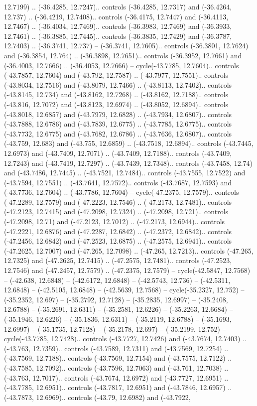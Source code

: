 \begin{scope}[shift={(2.5552, 9.9912)}]
\begin{scope}[shift={(48.1654, -14.8546)}]
12.7199) .. (-36.4285, 12.7247).. controls (-36.4285, 12.7317) and (-36.4264, 12.737) .. (-36.4219, 12.7408).. controls (-36.4175, 12.7447) and (-36.4113, 12.7467) .. (-36.4034, 12.7469).. controls (-36.3983, 12.7469) and (-36.3933, 12.7461) .. (-36.3885, 12.7445).. controls (-36.3835, 12.7429) and (-36.3787, 12.7403) .. (-36.3741, 12.737) -- (-36.3741, 12.7605).. controls (-36.3801, 12.7624) and (-36.3854, 12.764) .. (-36.3898, 12.7651).. controls (-36.3952, 12.7661) and (-36.4003, 12.7666) .. (-36.4053, 12.7666) -- cycle(-43.7785, 12.7604).. controls (-43.7857, 12.7604) and (-43.792, 12.7587) .. (-43.7977, 12.7551).. controls (-43.8034, 12.7516) and (-43.8079, 12.7466) .. (-43.8113, 12.7402).. controls (-43.8145, 12.734) and (-43.8162, 12.7268) .. (-43.8162, 12.7188).. controls (-43.816, 12.7072) and (-43.8123, 12.6974) .. (-43.8052, 12.6894).. controls (-43.8018, 12.6857) and (-43.7979, 12.6828) .. (-43.7934, 12.6807).. controls (-43.7888, 12.6786) and (-43.7839, 12.6775) .. (-43.7785, 12.6775).. controls (-43.7732, 12.6775) and (-43.7682, 12.6786) .. (-43.7636, 12.6807).. controls (-43.759, 12.683) and (-43.755, 12.6859) .. (-43.7518, 12.6894).. controls (-43.7445, 12.6973) and (-43.7409, 12.7071) .. (-43.7409, 12.7188).. controls (-43.7409, 12.7243) and (-43.7419, 12.7297) .. (-43.7439, 12.7348).. controls (-43.7458, 12.74) and (-43.7486, 12.7445) .. (-43.7521, 12.7484).. controls (-43.7555, 12.7522) and (-43.7594, 12.7551) .. (-43.7641, 12.7572).. controls (-43.7687, 12.7593) and (-43.7736, 12.7604) .. (-43.7786, 12.7604) -- cycle(-47.2375, 12.7579).. controls (-47.2289, 12.7579) and (-47.2223, 12.7546) .. (-47.2173, 12.7481).. controls (-47.2123, 12.7415) and (-47.2098, 12.7324) .. (-47.2098, 12.721).. controls (-47.2098, 12.71) and (-47.2123, 12.7012) .. (-47.2173, 12.6944).. controls (-47.2221, 12.6876) and (-47.2287, 12.6842) .. (-47.2372, 12.6842).. controls (-47.2456, 12.6842) and (-47.2523, 12.6875) .. (-47.2575, 12.6941).. controls (-47.2625, 12.7007) and (-47.265, 12.7098) .. (-47.265, 12.7213).. controls (-47.265, 12.7325) and (-47.2625, 12.7415) .. (-47.2575, 12.7481).. controls (-47.2523, 12.7546) and (-47.2457, 12.7579) .. (-47.2375, 12.7579) -- cycle(-42.5847, 12.7568) -- (-42.638, 12.6848) -- (-42.6172, 12.6848) -- (-42.5743, 12.736) -- (-42.5311, 12.6848) -- (-42.5105, 12.6848) -- (-42.5639, 12.7568) -- cycle(-35.2327, 12.752) -- (-35.2352, 12.697) -- (-35.2792, 12.7128) -- (-35.2835, 12.6997) -- (-35.2408, 12.6788) -- (-35.2691, 12.6311) -- (-35.2581, 12.6226) -- (-35.2263, 12.6684) -- (-35.1946, 12.6226) -- (-35.1836, 12.6311) -- (-35.2119, 12.6788) -- (-35.1693, 12.6997) -- (-35.1735, 12.7128) -- (-35.2178, 12.697) -- (-35.2199, 12.752) -- cycle(-43.7785, 12.7428).. controls (-43.7727, 12.7426) and (-43.7674, 12.7403) .. (-43.763, 12.7359).. controls (-43.7589, 12.7311) and (-43.7569, 12.7254) .. (-43.7569, 12.7188).. controls (-43.7569, 12.7154) and (-43.7575, 12.7122) .. (-43.7585, 12.7092).. controls (-43.7596, 12.7063) and (-43.761, 12.7038) .. (-43.763, 12.7017).. controls (-43.7674, 12.6972) and (-43.7727, 12.6951) .. (-43.7785, 12.6951).. controls (-43.7817, 12.6951) and (-43.7846, 12.6957) .. (-43.7873, 12.6969).. controls (-43.79, 12.6982) and (-43.7922, 
\end{scope}
\end{scope}
